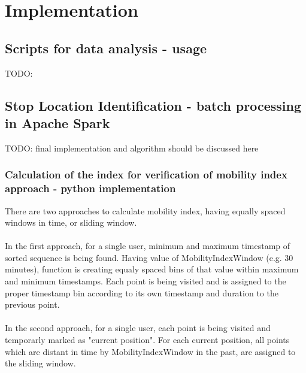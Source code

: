 \chapter{Implementation}
\label{cha:implementation}

\section{Scripts for data analysis - usage}

TODO: 

\section{Stop Location Identification - batch processing in Apache Spark}

TODO: final implementation and algorithm should be discussed here

\subsection{Calculation of the index for verification of mobility index approach - python implementation}

There are two approaches to calculate mobility index, having equally spaced windows in time, or sliding window.
\\\\
In the first approach, for a single user, minimum and maximum timestamp of sorted sequence is being found. Having value of MobilityIndexWindow (e.g. 30 minutes), function is creating equaly spaced bins of that value within maximum and minimum timestamps. Each point is being visited and is assigned to the proper timestamp bin according to its own timestamp and duration to the previous point. 
\\\\
In the second approach, for a single user, each point is being visited and temporarly marked as "current position". For each current position, all points which are distant in time by MobilityIndexWindow in the past, are assigned to the sliding window.

